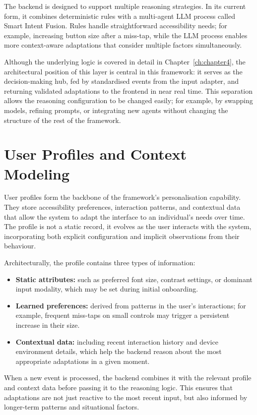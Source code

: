 The backend is designed to support multiple reasoning strategies. In its current form, it combines deterministic rules with a multi-agent LLM process called Smart Intent Fusion. Rules handle straightforward accessibility needs; for example, increasing button size after a miss-tap, while the LLM process enables more context-aware adaptations that consider multiple factors simultaneously.

Although the underlying logic is covered in detail in Chapter~\ref{ch:chapter4}, the architectural position of this layer is central in this framework: it serves as the decision-making hub, fed by standardised events from the input adapter, and returning validated adaptations to the frontend in near real time. This separation allows the reasoning configuration to be changed easily; for example, by swapping models, refining prompts, or integrating new agents without changing the structure of the rest of the framework.

\section{User Profiles and Context Modeling}
User profiles form the backbone of the framework’s personalisation capability. They store accessibility preferences, interaction patterns, and contextual data that allow the system to adapt the interface to an individual’s needs over time. The profile is not a static record, it evolves as the user interacts with the system, incorporating both explicit configuration and implicit observations from their behaviour.

Architecturally, the profile contains three types of information:
\begin{itemize}
    \item \textbf{Static attributes:} such as preferred font size, contrast settings, or dominant input modality, which may be set during initial onboarding.
    \item \textbf{Learned preferences:} derived from patterns in the user’s interactions; for example, frequent miss-taps on small controls may trigger a persistent increase in their size.
    \item \textbf{Contextual data:} including recent interaction history and device environment details, which help the backend reason about the most appropriate adaptations in a given moment.
\end{itemize}
When a new event is processed, the backend combines it with the relevant profile and context data before passing it to the reasoning logic. This ensures that adaptations are not just reactive to the most recent input, but also informed by longer-term patterns and situational factors.

